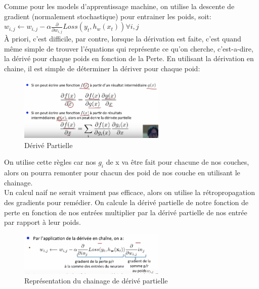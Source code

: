 \documentclass[oneside]{book}
\begin{document}
Comme pour les models d'apprentissage machine, on utilise la descente de gradient (normalement stochastique) pour entrainer les poids, soit:\\

\centering
$w_{i,j} \leftarrow w_{i,j} - \alpha \frac{\partial}{\partial w_{i,j}} Loss(y_t , h_w (x_t)) \forall i, j$\\

\justify
À priori, c'est difficile, par contre, lorsque la dérivation est faite, c'est quand même simple de trouver l'équations qui représente ce qu'on cherche, c'est-a-dire, la dérivé pour chaque poids en fonction de la Perte. En utilisant la dérivation en chaine, il est simple de déterminer la dériver pour chaque poid:\\

\begin{figure}[!ht]
\centering
\includegraphics[width = 7cm]{derive_partielle.png}
\caption{Dérivé Partielle}
\label{fig:derive_partielle}
\end{figure}

On utilise cette règles car nos $g_i$ de x va être fait pour chacune de nos couches, alors on pourra remonter pour chacun des poid de nos couche en utilisant le chainage.\\

Un calcul naif ne serait vraiment pas efficace, alors on utilise la rétropropagation des gradients pour remédier. On calcule la dérivé partielle de notre fonction de perte en fonction de nos entrées multiplier par la dérivé partielle de nos entrée par rapport à leur poids. \\

\begin{figure}[!ht]
\centering
\includegraphics[width = 7cm]{derive_partielle_chainage.png}
\caption{Représentation du chainage de dérivé partielle}
\label{fig:derive_partielle_chainage}
\end{figure}
\end{document}
